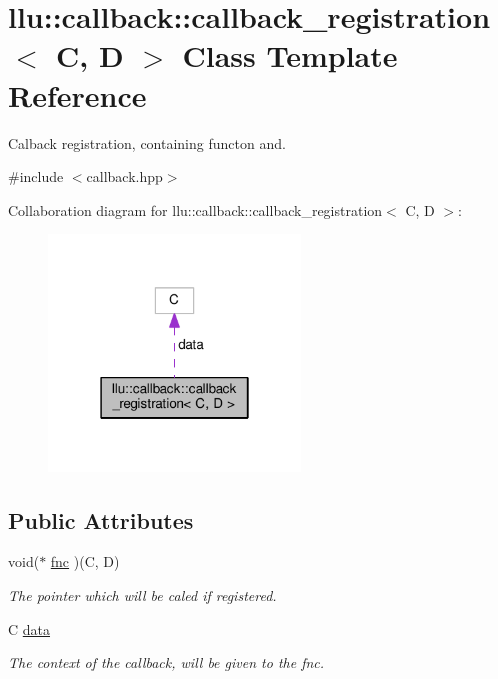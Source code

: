 \hypertarget{classllu_1_1callback_1_1callback__registration}{\section{llu\+:\+:callback\+:\+:callback\+\_\+registration$<$ C, D $>$ Class Template Reference}
\label{classllu_1_1callback_1_1callback__registration}
}


Calback registration, containing functon and.  




{\ttfamily \#include $<$callback.\+hpp$>$}



Collaboration diagram for llu\+:\+:callback\+:\+:callback\+\_\+registration$<$ C, D $>$\+:
\nopagebreak
\begin{figure}[H]
\begin{center}
\leavevmode
\includegraphics[width=190pt]{classllu_1_1callback_1_1callback__registration__coll__graph}
\end{center}
\end{figure}
\subsection*{Public Attributes}
\begin{DoxyCompactItemize}
\item 
void($\ast$ \hyperlink{classllu_1_1callback_1_1callback__registration_a470bbcee9d41e0070e9630461b88084d}{fnc} )(C, D)
\begin{DoxyCompactList}\small\item\em The pointer which will be caled if registered. \end{DoxyCompactList}\item 
C \hyperlink{classllu_1_1callback_1_1callback__registration_aecc9f23363c08b42144d70d928b4ec02}{data}
\begin{DoxyCompactList}\small\item\em The context of the callback, will be given to the fnc. \end{DoxyCompactList}\end{DoxyCompactItemize}


